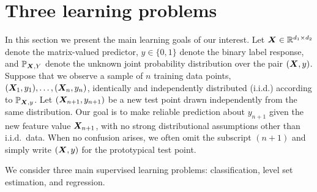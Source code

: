 \documentclass[12pt]{article}
\begin{document}
\section{Three learning problems}
In this section we present the main learning goals of our interest. Let $\bm X\in\mathbb{R}^{d_1\times d_2}$ denote the matrix-valued predictor, $y\in\{0,1\}$ denote the binary label response, and $\mathbb{P}_{\bm X,Y}$ denote the unknown joint probability distribution over the pair $(\bm X,y)$. Suppose that we observe a sample of $n$ training data points, $(\bm X_1,y_1),\ldots,(\bm X_n,y_n)$, identically and independently distributed (i.i.d.) according to $\mathbb{P}_{\bm X,y}$. Let $(\bm X_{n+1},y_{n+1})$ be a new test point drawn independently from the same distribution. Our goal is to make reliable prediction about $y_{n+1}$ given the new feature value $\bm X_{n+1}$, with no strong distributional assumptions other than i.i.d.\ data. When no confusion arises, we often omit the subscript $(n+1)$ and simply write $(\bm X,y)$ for the prototypical test point. 

We consider three main supervised learning problems: classification, level set estimation, and regression. 
\end{document}
